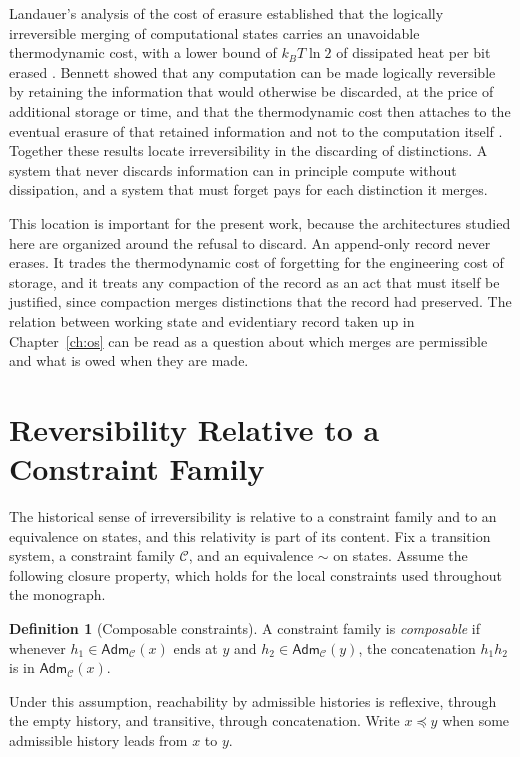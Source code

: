 \documentclass[11pt,twoside,openright]{book}
\theoremstyle{plain}
\theoremstyle{definition}
\newtheorem{definition}[theorem]{Definition}
\theoremstyle{remark}
\newcommand{\Adm}{\mathsf{Adm}}
\begin{document}
Landauer's analysis of the cost of erasure established that the logically irreversible merging of computational states carries an unavoidable thermodynamic cost, with a lower bound of $k_B T\ln 2$ of dissipated heat per bit erased \cite{landauer1961}. Bennett showed that any computation can be made logically reversible by retaining the information that would otherwise be discarded, at the price of additional storage or time, and that the thermodynamic cost then attaches to the eventual erasure of that retained information and not to the computation itself \cite{bennett1973}. Together these results locate irreversibility in the discarding of distinctions. A system that never discards information can in principle compute without dissipation, and a system that must forget pays for each distinction it merges.

This location is important for the present work, because the architectures studied here are organized around the refusal to discard. An append-only record never erases. It trades the thermodynamic cost of forgetting for the engineering cost of storage, and it treats any compaction of the record as an act that must itself be justified, since compaction merges distinctions that the record had preserved. The relation between working state and evidentiary record taken up in Chapter~\ref{ch:os} can be read as a question about which merges are permissible and what is owed when they are made.

\section{Reversibility Relative to a Constraint Family}

The historical sense of irreversibility is relative to a constraint family and to an equivalence on states, and this relativity is part of its content. Fix a transition system, a constraint family $\mathcal{C}$, and an equivalence $\sim$ on states. Assume the following closure property, which holds for the local constraints used throughout the monograph.

\begin{definition}[Composable constraints]
A constraint family is \emph{composable} if whenever $h_1\in\Adm_{\mathcal{C}}(x)$ ends at $y$ and $h_2\in\Adm_{\mathcal{C}}(y)$, the concatenation $h_1h_2$ is in $\Adm_{\mathcal{C}}(x)$.
\end{definition}

Under this assumption, reachability by admissible histories is reflexive, through the empty history, and transitive, through concatenation. Write $x\preceq y$ when some admissible history leads from $x$ to $y$.
\end{document}
